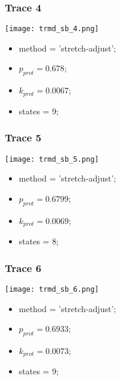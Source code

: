 \subsubsection{Trace 4}
\begin{minipage}[c]{0.7\textwidth}
    \texttt{[image: trmd\_sb\_4.png]}
\end{minipage}
\hfill
\begin{minipage}[c]{0.45\textwidth}
    \begin{itemize}
        \item method = 'stretch-adjust';
        \item $p_{prot}=0.678$;
        \item $k_{prot}=0.0067$;
        \item states = 9;
    \end{itemize}
\end{minipage}

\subsubsection{Trace 5}
\begin{minipage}[c]{0.7\textwidth}
    \texttt{[image: trmd\_sb\_5.png]}
\end{minipage}
\hfill
\begin{minipage}[c]{0.45\textwidth}
    \begin{itemize}
        \item method = 'stretch-adjust';
        \item $p_{prot}=0.6799$;
        \item $k_{prot}=0.0069$;
        \item states = 8;
    \end{itemize}
\end{minipage}

\subsubsection{Trace 6}
\begin{minipage}[c]{0.7\textwidth}
    \texttt{[image: trmd\_sb\_6.png]}
\end{minipage}
\hfill
\begin{minipage}[c]{0.45\textwidth}
    \begin{itemize}
        \item method = 'stretch-adjust';
        \item $p_{prot}=0.6933$;
        \item $k_{prot}=0.0073$;
        \item states = 9;
    \end{itemize}
\end{minipage}

